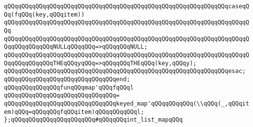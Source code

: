 \verb|qQQqqQQqqQQqqQQqqQQqqQQqqQQqqQQqqQQqqQQqqQQqqQQqqQQqqQQqqQQqqQQqcaseqQQq(fqQQq(key,qQQqitem))|\newline
\verb|qQQqqQQqqQQqqQQqqQQqqQQqqQQqqQQqqQQqqQQqqQQqqQQqqQQqqQQqqQQqqQQqqQQqqQQq|\newline
\verb|qQQqqQQqqQQqqQQqqQQqqQQqqQQqqQQqqQQqqQQqqQQqqQQqqQQqqQQqqQQqqQQqqQQqqQQqqQQqqQQqqQQqNULLqQQqqQQq=>qQQqqQQqNULL;|\newline
\verb|qQQqqQQqqQQqqQQqqQQqqQQqqQQqqQQqqQQqqQQqqQQqqQQqqQQqqQQqqQQqqQQqqQQqqQQqqQQqqQQqqQQqTHEqQQqyqQQq=>qQQqqQQqTHEqQQq(key,qQQqy);|\newline
\verb|qQQqqQQqqQQqqQQqqQQqqQQqqQQqqQQqqQQqqQQqqQQqqQQqqQQqqQQqqQQqqQQqesac;|\newline
\verb|qQQqqQQqqQQqqQQqqQQqqQQqqQQqqQQqend;|\newline
\newline
\verb|qQQqqQQqqQQqqQQqfunqQQqmap'qQQqfqQQql|\newline
\verb|qQQqqQQqqQQqqQQqqQQqqQQqqQQqqQQq=|\newline
\verb|qQQqqQQqqQQqqQQqqQQqqQQqqQQqqQQqkeyed_map'qQQqqQQqqQQq(\\qQQq(_,qQQqitem)qQQq=qQQqqQQqfqQQqitem)qQQqqQQqqQQql;|\newline
\newline
\newline
\verb|};qQQqqQQqqQQqqQQqqQQqqQQq#qQQqqQQqint_list_mapqQQq|\newline
\newline
\newline

